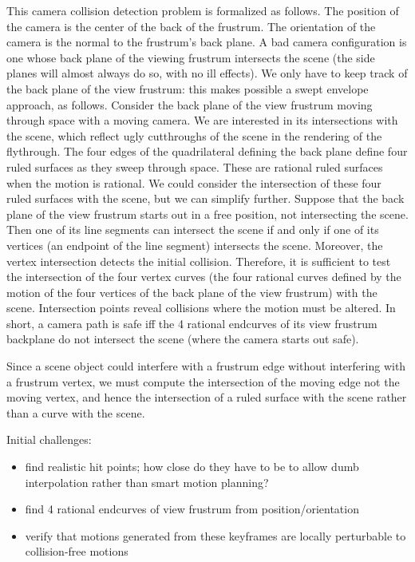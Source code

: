 \documentclass[12pt]{article}
\begin{document}
This camera collision detection problem is formalized as follows.
The position of the camera is the center of the back of the frustrum.
The orientation of the camera is the normal to the frustrum's back plane.
A bad camera configuration is one whose back plane of the viewing frustrum 
intersects the scene (the side planes will almost always do so, with no ill effects).
We only have to keep track of the back plane of the view frustrum: this makes possible
a swept envelope approach, as follows.
Consider the back plane of the view frustrum moving through space with a moving camera.
We are interested in its intersections with the scene, which reflect ugly cutthroughs
of the scene in the rendering of the flythrough.
The four edges of the quadrilateral defining the back plane define four ruled surfaces
as they sweep through space.
These are rational ruled surfaces when the motion is rational.
We could consider the intersection of these four ruled surfaces with the scene,
but we can simplify further.
Suppose that the back plane of the view frustrum starts out in a free position,
not intersecting the scene.
Then one of its line segments can intersect the scene if and only if one of its vertices
(an endpoint of the line segment) intersects the scene.
Moreover, the vertex intersection detects the initial collision.
Therefore, it is sufficient to test the intersection of the four vertex curves
(the four rational curves defined by the motion of the four vertices of the back plane
of the view frustrum) with the scene.
Intersection points reveal collisions where the motion must be altered.
In short, a camera path is safe iff the 4 rational endcurves of its view frustrum
backplane do not intersect the scene (where the camera starts out safe).

Since a scene object could interfere with a frustrum edge without
interfering with a frustrum vertex, we must compute the intersection of the moving edge
not the moving vertex, and hence the intersection of a ruled surface with the scene
rather than a curve with the scene.

Initial challenges:
\begin{itemize}
\item find realistic hit points;
      how close do they have to be to allow dumb interpolation rather than
      smart motion planning?
\item find 4 rational endcurves of view frustrum from position/orientation 
\item verify that motions generated from these keyframes are locally perturbable
      to collision-free motions
\end{itemize}
\end{document}
